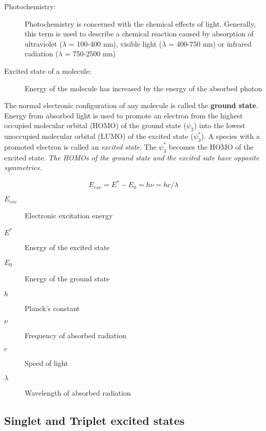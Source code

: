 \documentclass[a4paper,12pt,titlepage]{article}
\begin{document}
\begin{frame}
 \begin{description}
  \item[Photochemistry:] Photochemistry is concerned with the chemical effects of light. Generally, this term is used to      describe a chemical reaction caused by absorption of ultraviolet (\(\lambda\) = 100-400 nm), visible light (\(\lambda\) = 400-750 nm) or infrared radiation (\(\lambda\) = 750-2500 nm)
  \item[Excited state of a molecule:] Energy of the molecule has increased by the energy of the absorbed photon \\
  
 \end{description}
\end{frame}

The normal electronic configuration of any molecule is called the \textbf{ground state}. Energy from absorbed light is used to promote an electron from the highest occupied molecular orbital (HOMO) of the ground state (\(\psi_2\)) into the lowest unoccupied molecular orbital (LUMO) of the excited state (\(\psi_3^*\)). A species with a promoted electron is called an \emph{excited state}. The \(\psi_3^*\) becomes the HOMO of the excited state. \emph{The HOMOs of the ground state and the excited sate have opposite symmetries.}


\begin{frame}
\[ E_{exc} = E^* - E_0 = h\nu = hc/\lambda \]  
  \begin{description}
    \item[\(E_{exc}\)] Electronic excitation energy
    \item[\(E^*\)] Energy of the excited state		
    \item[\(E_0\)] Energy of the ground state
    \item[\(h\)] Planck’s constant
    \item[\(\nu\)] Frequency of absorbed radiation
    \item[	\(c\)] Speed of light
    \item[	\(\lambda\)] Wavelength of absorbed radiation
  \end{description}
\end{frame}

\subsection{Singlet and Triplet excited states}
\end{document}
